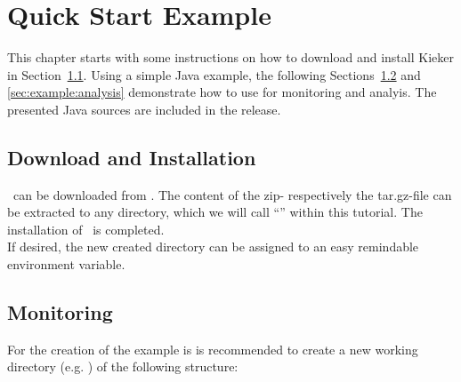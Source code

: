\chapter{Quick Start Example}
This chapter starts with some instructions on how to download and install Kieker %
in Section~\ref{sec:example:downloadInstall}. %
Using a simple Java example, the following Sections~\ref{sec:example:monitoring} %
and \ref{sec:example:analysis} demonstrate how to use \Kieker{} for monitoring %
and analyis. %
\notify The presented Java sources are included in the \Kieker{} release.

	\section{Download and Installation}\label{sec:example:downloadInstall}
		\Kieker\  can be downloaded from \KiekerURL. The content of the zip- respectively the tar.gz-file can be extracted to any directory, which we will call ``\KiekerDir'' within this tutorial. The installation of \Kieker\ is completed.\\
		If desired, the new created directory can be assigned to an easy remindable environment variable.


	\section{Monitoring}\label{sec:example:monitoring}
		For the creation of the example is is recommended to create a new working directory (e.g. ) of the following structure:

